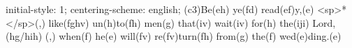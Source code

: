 initial-style: 1;
centering-scheme: english;
(c3)Be(eh) ye(fd) read(ef)y,(e) <sp>*</sp>(,) like(fghv) un(h)to(fh) men(g) that(iv) wait(iv) for(h) the(iji) Lord,(hg/hih) (,) when(f) he(e) will(fv) re(fv)turn(fh) from(g) the(f) wed(e)ding.(e)

